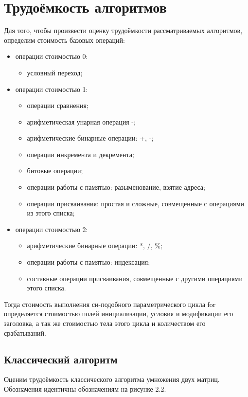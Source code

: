 \section{Трудоёмкость алгоритмов}
Для того, чтобы произвести оценку трудоёмкости рассматриваемых алгоритмов, определим стоимость базовых операций:
\begin{itemize}
    \item операции стоимостью 0:
        \begin{itemize}
            \item условный переход;
        \end{itemize}
    \item операции стоимостью 1:
        \begin{itemize}
            \item операции сравнения;
            \item арифметическая унарная операция -;
            \item арифметические бинарные операции: +, -;
            \item операции инкремента и декремента;
            \item битовые операции;
            \item операции работы с памятью: разыменование, взятие адреса;
            \item операции присваивания: простая и сложные, совмещенные с операциями из этого списка;
        \end{itemize}
    \item операции стоимостью 2:
        \begin{itemize}
            \item арифметические бинарные операции: *, /, \%;
            \item операции работы с памятью: индексация;
            \item составные операции присваивания, совмещенные с другими операциями этого списка.
        \end{itemize}
\end{itemize}

Тогда стоимость выполнения си-подобного параметрического цикла for определяется стоимостью полей инициализации, условия и модификации его заголовка, а так же стоимостью тела этого цикла и количеством его  срабатываний.

\subsection{Классический алгоритм}
Оценим трудоёмкость классического алгоритма умножения двух матриц. Обозначения идентичны обозначениям на рисунке 2.2.


